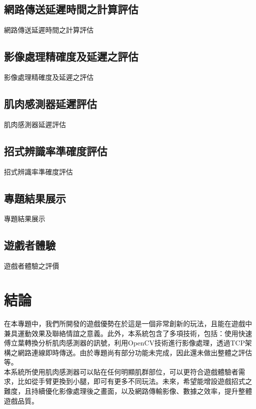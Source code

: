 \documentclass[12pt]{article}  %
\theoremstyle{plain}
\begin{document}
\subsection{網路傳送延遲時間之計算評估}
網路傳送延遲時間之計算評估

\subsection{影像處理精確度及延遲之評估}
影像處理精確度及延遲之評估

\subsection{肌肉感測器延遲評估}
肌肉感測器延遲評估

\subsection{招式辨識率準確度評估}
招式辨識率準確度評估

\subsection{專題結果展示}
專題結果展示

\subsection{遊戲者體驗}
遊戲者體驗之評價
\newpage

\section{結論}
在本專題中，我們所開發的遊戲優勢在於這是一個非常創新的玩法，且能在遊戲中兼具運動效果及聯絡情誼之意義。此外，本系統包含了多項技術，包括：使用快速傅立葉轉換分析肌肉感測器的訊號，利用OpenCV技術進行影像處理，透過TCP架構之網路連線即時傳送。由於專題尚有部分功能未完成，因此還未做出整體之評估等。\\
\indent 本系統所使用肌肉感測器可以貼在任何明顯肌群部位，可以更符合遊戲體驗者需求，比如從手臂更換到小腿，即可有更多不同玩法。未來，希望能增設遊戲招式之難度，且持續優化影像處理後之畫面，以及網路傳輸影像、數據之效率，提升整體遊戲品質。\\
\newpage
\end{document}
